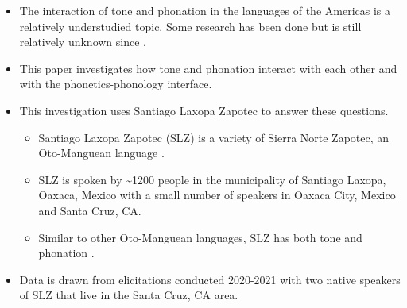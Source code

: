 \documentclass[12pt, letterpaper]{article}
\begin{document}
\begin{itemize}
	\item The interaction of tone and phonation in the languages of the Americas is a relatively understudied topic. Some research has been done but is still relatively unknown since \citet{silvermanLaryngealComplexityOtomanguean1997}.  

	\item This paper investigates how tone and phonation interact with each other and with the phonetics-phonology interface. 

	\item This investigation uses Santiago Laxopa Zapotec to answer these questions.
	\begin{itemize}
		\item Santiago Laxopa Zapotec (SLZ) is a variety of Sierra Norte Zapotec, an Oto-Manguean language \citep{adlerDerivationVerbInitiality2018,sichelFeaturalLifeNominals2020}.

		\item SLZ is spoken by \textasciitilde 1200 people in the municipality of Santiago Laxopa, Oaxaca, Mexico with a small number of speakers in Oaxaca City, Mexico and Santa Cruz, CA. 

		\item Similar to other Oto-Manguean languages, SLZ has both tone and phonation \citep{campbellMesoAmericaLinguisticArea1986,stolzMesoamericaLinguisticArea2001,campbellOtomangueanHistoricalLinguistics2017a,campbellOtomangueanHistoricalLinguistics2017}. 
	\end{itemize}

	\item Data is drawn from elicitations conducted 2020-2021 with two native speakers of SLZ that live in the Santa Cruz, CA area.  

\end{itemize}

\end{document}

